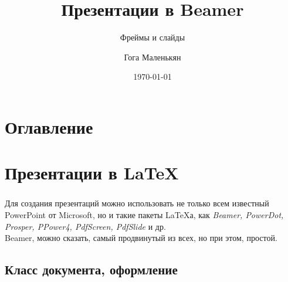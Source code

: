 \documentclass[aspectratio=169,
]{beamer}
\title{Презентации в Beamer}
\subtitle{Фреймы и слайды}
\author{Гога Маленькян}
\date{\today}
\begin{document}
\begin{frame}[label= ftitle]%
\maketitle
\end{frame}


\section{Оглавление}

\begin{frame}[label=cont,shrink=20] \label{cont}%
\frametitle{\insertsection}
\tableofcontents%
\end{frame}



\section{Презентации в \LaTeX}

\begin{frame}[label=f1]
\frametitle{\insertsection}
Для создания презентаций можно использовать не только всем известный PowerPoint от Microsoft, но и такие пакеты \LaTeX а, как \textit{Beamer, PowerDot, Prosper, PPower4, PdfScreen, PdfSlide} и др. \\
Beamer, можно сказать, самый продвинутый из всех, но при этом, простой.
\end{frame}



\subsection{Класс документа, оформление}
\end{document}
